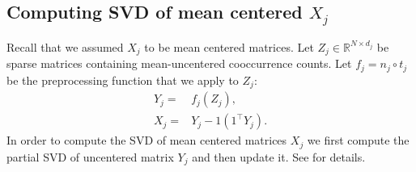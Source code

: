 \documentclass[11pt]{article}
\begin{document}
\subsection{Computing SVD of mean centered $X_j$}
\label{ssec:svdmc}
Recall that we assumed $X_j$ to be mean centered matrices. Let $Z_j
\in \mathbb{R}^{N \times d_j}$ be sparse matrices containing
mean-uncentered cooccurrence counts. Let $f_j = n_j \circ t_j $ be the preprocessing
function that we apply to $Z_j$: 
\begin{align}
  Y_j =& f_j (Z_j), \\
  X_j =& Y_j - 1 (1^\top Y_j).
\end{align}
In order to compute the SVD of mean centered matrices $X_j$ we first
compute the partial SVD of uncentered 
matrix $Y_j$ and then update it. See \cite{brand2006fast} for details.
\end{document}
